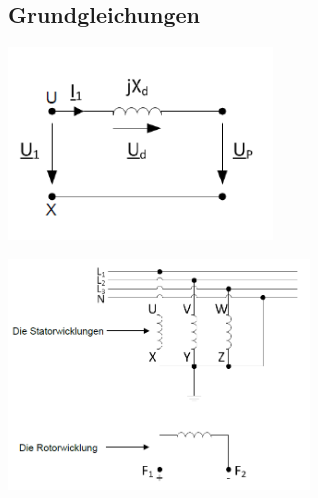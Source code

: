 \subsection{Grundgleichungen}
    \begin{minipage}[b]{0.5\linewidth}
        \includegraphics[width = 7cm]{images/Wicklung1}
    \end{minipage}
    \begin{minipage}[b]{0.5\linewidth}
        \includegraphics[width = 8cm]{images/Wicklungen}
    \end{minipage}
    \vspace{-1cm}
